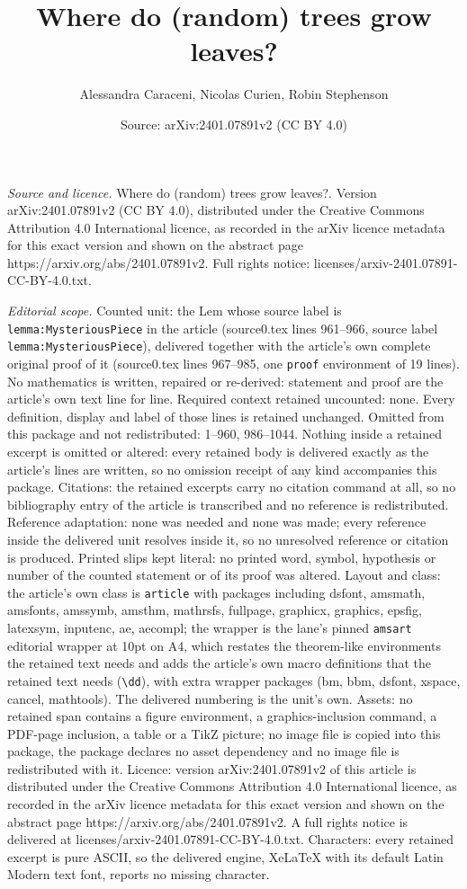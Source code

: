 \documentclass[10pt,a4paper]{amsart}
\title[Where do (random) trees grow leaves?]{Where do (random) trees grow leaves?}
\author{Alessandra Caraceni, Nicolas Curien, Robin Stephenson}
\date{Source: arXiv:2401.07891v2 (CC BY 4.0)}
\begin{document}
\maketitle

\noindent\emph{Source and licence.} Where do (random) trees grow leaves?. Version arXiv:2401.07891v2 (CC BY 4.0), distributed under the Creative Commons Attribution 4.0 International licence, as recorded in the arXiv licence metadata for this exact version and shown on the abstract page https://arxiv.org/abs/2401.07891v2. Full rights notice: licenses/arxiv-2401.07891-CC-BY-4.0.txt.\par\smallskip

\noindent\textit{Editorial scope.} Counted unit: the Lem whose source label is \texttt{lemma:MysteriousPiece} in the article (source0.tex lines 961--966, source label \texttt{lemma:MysteriousPiece}), delivered together with the article's own complete original proof of it (source0.tex lines 967--985, one \texttt{proof} environment of 19 lines). No mathematics is written, repaired or re-derived: statement and proof are the article's own text line for line. Required context retained uncounted: none. Every definition, display and label of those lines is retained unchanged. Omitted from this package and not redistributed: 1--960, 986--1044. Nothing inside a retained excerpt is omitted or altered: every retained body is delivered exactly as the article's lines are written, so no omission receipt of any kind accompanies this package. Citations: the retained excerpts carry no citation command at all, so no bibliography entry of the article is transcribed and no reference is redistributed. Reference adaptation: none was needed and none was made; every reference inside the delivered unit resolves inside it, so no unresolved reference or citation is produced. Printed slips kept literal: no printed word, symbol, hypothesis or number of the counted statement or of its proof was altered. Layout and class: the article's own class is \texttt{article} with packages including dsfont, amsmath, amsfonts, amssymb, amsthm, mathrsfs, fullpage, graphicx, graphics, epsfig, latexsym, inputenc, ae, aecompl; the wrapper is the lane's pinned \texttt{amsart} editorial wrapper at 10pt on A4, which restates the theorem-like environments the retained text needs and adds the article's own macro definitions that the retained text needs (\texttt{\textbackslash dd}), with extra wrapper packages (bm, bbm, dsfont, xspace, cancel, mathtools). The delivered numbering is the unit's own. Assets: no retained span contains a figure environment, a graphics-inclusion command, a PDF-page inclusion, a table or a TikZ picture; no image file is copied into this package, the package declares no asset dependency and no image file is redistributed with it. Licence: version arXiv:2401.07891v2 of this article is distributed under the Creative Commons Attribution 4.0 International licence, as recorded in the arXiv licence metadata for this exact version and shown on the abstract page https://arxiv.org/abs/2401.07891v2. A full rights notice is delivered at licenses/arxiv-2401.07891-CC-BY-4.0.txt. Characters: every retained excerpt is pure ASCII, so the delivered engine, XeLaTeX with its default Latin Modern text font, reports no missing character.
\end{document}
